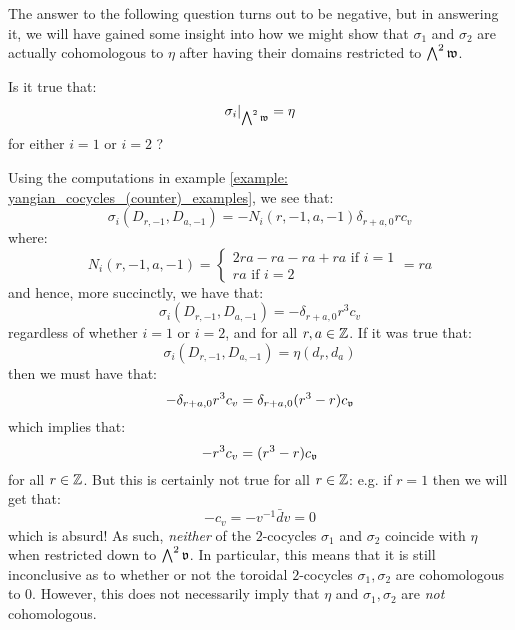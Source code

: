         The answer to the following question turns out to be negative, but in answering it, we will have gained some insight into how we might show that $\sigma_1$ and $\sigma_2$ are actually cohomologous to $\eta$ after having their domains restricted to $\bigwedge^2 \mathfrak{w}$.
        \begin{question}
            Is it true that:
                $$\sigma_i|_{ \bigwedge^2 \mathfrak{w} } = \eta$$
            for either $i = 1$ or $i = 2$ ?
        \end{question}
        Using the computations in example \ref{example: yangian_cocycles_(counter)_examples}, we see that:
            $$\sigma_i(D_{r, -1}, D_{a, -1}) = -N_i(r, -1, a, -1) \delta_{r + a, 0} r c_v$$
        where:
            $$
                N_i(r, -1, a, -1) =
                \begin{cases}
                    \text{$2 ra - ra - ra + ra$ if $i = 1$}
                    \\
                    \text{$ra$ if $i = 2$}
                \end{cases}
                = ra
            $$
        and hence, more succinctly, we have that:
            $$\sigma_i(D_{r, -1}, D_{a, -1}) = -\delta_{r + a, 0} r^3 c_v$$
        regardless of whether $i = 1$ or $i = 2$, and for all $r, a \in \mathbb{Z}$. If it was true that:
            $$\sigma_i(D_{r, -1}, D_{a, -1}) = \eta(d_r, d_a)$$
        then we must have that:
            $$-\delta_{r + a, 0} r^3 c_v = \delta_{r + a, 0} (r^3 - r) c_{\mathfrak{v}}$$
        which implies that:
            $$-r^3 c_v = (r^3 - r) c_{\mathfrak{v}}$$
        for all $r \in \mathbb{Z}$. But this is certainly not true for all $r \in \mathbb{Z}$: e.g. if $r = 1$ then we will get that:
            $$-c_v = -v^{-1} \bar{d}v = 0$$
        which is absurd! As such, \textit{neither} of the $2$-cocycles $\sigma_1$ and $\sigma_2$ coincide with $\eta$ when restricted down to $\bigwedge^2 \mathfrak{v}$. In particular, this means that it is still inconclusive as to whether or not the toroidal $2$-cocycles $\sigma_1, \sigma_2$ are cohomologous to $0$. However, this does not necessarily imply that $\eta$ and $\sigma_1, \sigma_2$ are \textit{not} cohomologous. 

